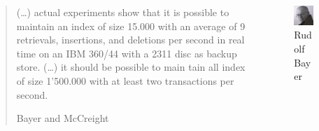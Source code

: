 \documentclass{beamer}
\begin{document}
\begin{frame}
    \begin{columns}
        \begin{column}{0.7\textwidth}
            \begin{block}{}
                \blockquote[Bayer and McCreight]{%
                    (\ldots) actual experiments show that it is possible 
                    to maintain an index of size 15.000 with an average of 9 retrievals, 
                    insertions, and deletions per second in real time on an IBM 360/44 
                    with a 2311 disc as backup store. (\ldots) it should be possible 
                    to main tain all index of size 1'500.000 with at least two transactions 
                    per second.}
            \end{block}
        \end{column}
        \begin{column}{0.3\textwidth}
            \begin{block}{}
                \begin{figure}
                    \includegraphics[height=0.3\textheight]{resources/made/r_bayer.png}
                    \caption[]{Rudolf Bayer}
                \end{figure}
                \begin{figure}

\end{figure}
\end{block}
\end{column}
\end{columns}
\end{frame}
\end{document}
